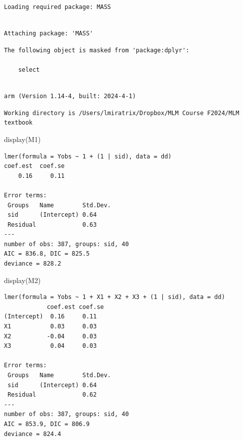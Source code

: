 \documentclass[
  letterpaper,
  DIV=11,
  numbers=noendperiod]{scrreprt}
\newenvironment{Shaded}{}{}
\newcommand{\FunctionTok}[1]{\textcolor[rgb]{0.02,0.16,0.49}{#1}}
\newcommand{\NormalTok}[1]{#1}
\begin{document}
\begin{verbatim}
Loading required package: MASS
\end{verbatim}

\begin{verbatim}

Attaching package: 'MASS'
\end{verbatim}

\begin{verbatim}
The following object is masked from 'package:dplyr':

    select
\end{verbatim}

\begin{verbatim}

arm (Version 1.14-4, built: 2024-4-1)
\end{verbatim}

\begin{verbatim}
Working directory is /Users/lmiratrix/Dropbox/MLM Course F2024/MLM textbook
\end{verbatim}

\begin{Shaded}
\begin{Highlighting}[]
\FunctionTok{display}\NormalTok{(M1)}
\end{Highlighting}
\end{Shaded}

\begin{verbatim}
lmer(formula = Yobs ~ 1 + (1 | sid), data = dd)
coef.est  coef.se 
    0.16     0.11 

Error terms:
 Groups   Name        Std.Dev.
 sid      (Intercept) 0.64    
 Residual             0.63    
---
number of obs: 387, groups: sid, 40
AIC = 836.8, DIC = 825.5
deviance = 828.2 
\end{verbatim}

\begin{Shaded}
\begin{Highlighting}[]
\FunctionTok{display}\NormalTok{(M2)}
\end{Highlighting}
\end{Shaded}

\begin{verbatim}
lmer(formula = Yobs ~ 1 + X1 + X2 + X3 + (1 | sid), data = dd)
            coef.est coef.se
(Intercept)  0.16     0.11  
X1           0.03     0.03  
X2          -0.04     0.03  
X3           0.04     0.03  

Error terms:
 Groups   Name        Std.Dev.
 sid      (Intercept) 0.64    
 Residual             0.62    
---
number of obs: 387, groups: sid, 40
AIC = 853.9, DIC = 806.9
deviance = 824.4 
\end{verbatim}
\end{document}
